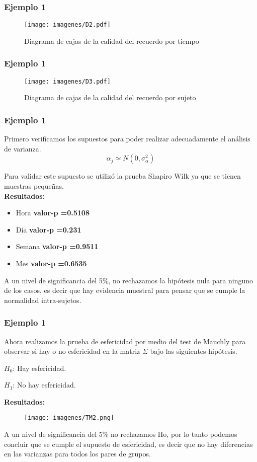 \documentclass[12pt]{beamer}
\begin{document}
\begin{frame}
\frametitle{Ejemplo 1}
\begin{figure}[h!]
\caption{Diagrama de cajas de la calidad del recuerdo por tiempo}
  \centering
  \texttt{[image: imagenes/D2.pdf]}
\end{figure}
\end{frame}

\begin{frame}
\frametitle{Ejemplo 1}
\begin{figure}[h!]
\caption{Diagrama de cajas de la calidad del recuerdo por sujeto}
  \centering
  \texttt{[image: imagenes/D3.pdf]}
\end{figure}
\end{frame}

\begin{frame}
\frametitle{Ejemplo 1}
Primero verificamos los supuestos para poder realizar adecuadamente el análisis de varianza. 
 $$\alpha_j \simeq N(0,\sigma^2_\alpha)$$

Para validar este supuesto se utilizó la prueba Shapiro Wilk ya que se tienen muestras pequeñas.
~\\\textbf{Resultados:}
\begin{itemize}
\item[]Hora \textbf{valor-p =0.5108}
\item[]Día \textbf{valor-p =0.231}
\item[]Semana \textbf{valor-p =0.9511}
\item[]Mes \textbf{valor-p =0.6535}
\end{itemize}
A un nivel de significancia del 5\%, no rechazamos la hipótesis nula para ninguno de los casos, es
decir que hay evidencia muestral para pensar que se cumple la normalidad intra-sujetos.
\end{frame}

\begin{frame}
\frametitle{Ejemplo 1}
Ahora realizamos la prueba de esfericidad por medio del test de Mauchly para observar si hay o no
esfericidad en la matriz $\Sigma$ bajo las siguientes hipótesis.
\begin{center}
$H_0$: Hay esfericidad.

$H_1$: No hay esfericidad.
\end{center}
\textbf{Resultados:}
\begin{figure}[h!]
  \centering
  \texttt{[image: imagenes/TM2.png]}
\end{figure}
A un nivel de significancia del 5\% no rechazamos Ho, por lo tanto podemos concluir que se cumple
el supuesto de esfericidad, es decir que no hay diferencias en las varianzas para todos los pares
de grupos.
\end{frame}
\end{document}
